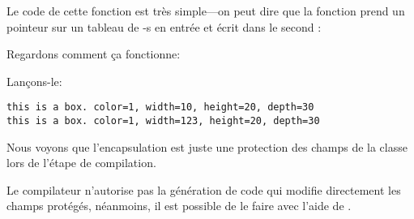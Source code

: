 Le code de cette fonction est très simple---on peut dire que la fonction prend un
pointeur sur un tableau de \Tint{}-s en entrée et écrit  dans le second \Tint{}:



Regardons comment ça fonctionne:



Lançons-le:

\begin{lstlisting}
this is a box. color=1, width=10, height=20, depth=30
this is a box. color=1, width=123, height=20, depth=30
\end{lstlisting}

Nous voyons que l'encapsulation est juste une protection des champs de la classe
lors de l'étape de compilation.

Le compilateur \Cpp n'autorise pas la génération de code qui modifie directement
les champs protégés, néanmoins, il est possible de le faire avec l'aide de .
